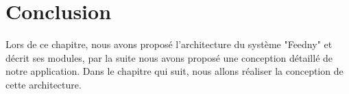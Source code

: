 \section{Conclusion}
Lors de ce chapitre, nous avons proposé l'architecture du système "Feedny" et décrit ses modules, par la suite nous avons proposé une conception détaillé de notre application. Dans le chapitre qui suit, nous allons réaliser la conception de cette architecture.